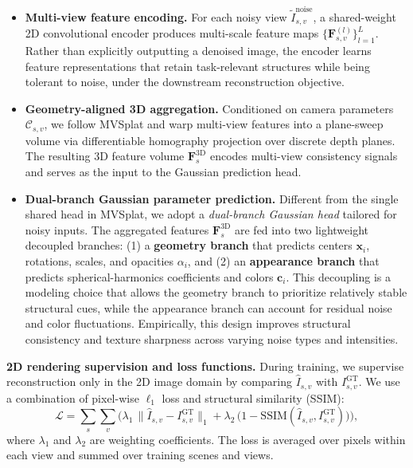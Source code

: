 \begin{itemize}
    \item \textbf{Multi-view feature encoding.}
    For each noisy view \(\tilde{I}^{\text{noise}}_{s,v}\), a shared-weight 2D convolutional encoder produces multi-scale feature maps \(\{\mathbf{F}^{(l)}_{s,v}\}_{l=1}^{L}\).
    Rather than explicitly outputting a denoised image, the encoder learns feature representations that retain task-relevant structures while being tolerant to noise, under the downstream reconstruction objective.

    \item \textbf{Geometry-aligned 3D aggregation.}
    Conditioned on camera parameters \(\mathcal{C}_{s,v}\), we follow MVSplat and warp multi-view features into a plane-sweep volume via differentiable homography projection over discrete depth planes.
    The resulting 3D feature volume \(\mathbf{F}^{3\mathrm{D}}_{s}\) encodes multi-view consistency signals and serves as the input to the Gaussian prediction head.

    \item \textbf{Dual-branch Gaussian parameter prediction.}
    Different from the single shared head in MVSplat, we adopt a \emph{dual-branch Gaussian head} tailored for noisy inputs.
    The aggregated features \(\mathbf{F}^{3\mathrm{D}}_{s}\) are fed into two lightweight decoupled branches:
    (1) a \textbf{geometry branch} that predicts centers \(\mathbf{x}_{i}\), rotations, scales, and opacities \(\alpha_{i}\), and
    (2) an \textbf{appearance branch} that predicts spherical-harmonics coefficients and colors \(\mathbf{c}_{i}\).
    This decoupling is a modeling choice that allows the geometry branch to prioritize relatively stable structural cues, while the appearance branch can account for residual noise and color fluctuations.
    Empirically, this design improves structural consistency and texture sharpness across varying noise types and intensities.
\end{itemize}

\noindent \textbf{2D rendering supervision and loss functions.}
During training, we supervise reconstruction only in the 2D image domain by comparing \(\hat{I}_{s,v}\) with \(I^{\text{GT}}_{s,v}\).
We use a combination of pixel-wise \(\ell_{1}\) loss and structural similarity (SSIM):
\begin{equation}
\mathcal{L}
= \sum_{s}\sum_{v}
\bigl(
\lambda_{1}\,\lVert \hat{I}_{s,v} - I^{\text{GT}}_{s,v} \rVert_{1}
+ \lambda_{2}\,\bigl(1 - \mathrm{SSIM}(\hat{I}_{s,v}, I^{\text{GT}}_{s,v})\bigr)
\bigr),
\label{eq:reconstruction_loss}
\end{equation}
where \(\lambda_{1}\) and \(\lambda_{2}\) are weighting coefficients.
The loss is averaged over pixels within each view and summed over training scenes and views.

